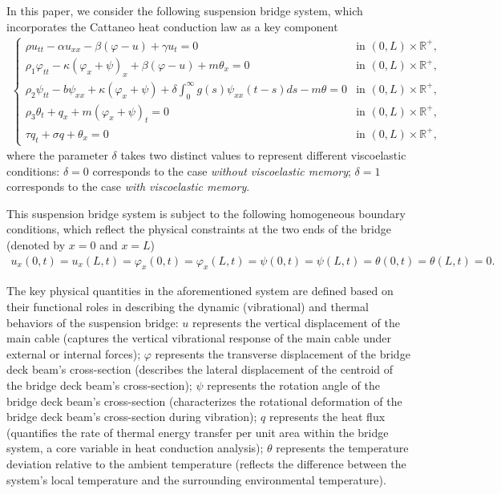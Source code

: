 \documentclass[11pt,reqno]{article}
\begin{document}
In this paper, we consider the following suspension bridge system, which incorporates the Cattaneo heat conduction law as a key component
	\begin{align}\label{model1.1}
		\begin{cases}
			\rho u_{tt} - \alpha u_{xx} - \beta(\varphi - u) + \gamma u_t = 0 & \text{in } (0,L) \times \mathbb{R}^+, \\
			\rho_1 \varphi_{tt} - \kappa(\varphi_x + \psi)_x + \beta (\varphi - u) + m \theta_x = 0 & \text{in } (0,L) \times \mathbb{R}^+, \\
			\rho_2 \psi_{tt} - b \psi_{xx} + \kappa(\varphi_x + \psi) + \delta \int_0^\infty g(s) \psi_{xx}(t-s)  ds - m \theta = 0 & \text{in } (0,L) \times \mathbb{R}^+, \\
			\rho_3 \theta_t + q_x + m (\varphi_x + \psi)_t = 0 & \text{in } (0,L) \times \mathbb{R}^+, \\
			\tau q_t + \sigma q + \theta_x = 0& \text{in } (0,L) \times \mathbb{R}^+,
		\end{cases}
	\end{align}
where the parameter $\delta$ takes two distinct values to represent different viscoelastic conditions: $\delta = 0$ corresponds to the case \textit{without viscoelastic memory}; $\delta = 1$ corresponds to the case \textit{with viscoelastic memory}.

 This suspension bridge system is subject to the following homogeneous boundary conditions, which reflect the physical constraints at the two ends of the bridge (denoted by $x=0$ and $x=L$)
	\begin{align*}
		u_x(0,t) = u_x(L,t) = \varphi_x(0,t) = \varphi_x(L,t) = \psi(0,t) = \psi(L,t) = \theta(0,t) = \theta(L,t) = 0.
	\end{align*}

The key physical quantities in the aforementioned system are defined based on their functional roles in describing the dynamic (vibrational) and thermal behaviors of the suspension bridge: $u$ represents the vertical displacement of the main cable (captures the vertical vibrational response of the main cable under external or internal forces); $\varphi$ represents the transverse displacement of the bridge deck beam's cross-section (describes the lateral displacement of the centroid of the bridge deck beam's cross-section); $\psi$ represents the rotation angle of the bridge deck beam's cross-section (characterizes the rotational deformation of the bridge deck beam's cross-section during vibration); $q$ represents the heat flux (quantifies the rate of thermal energy transfer per unit area within the bridge system, a core variable in heat conduction analysis); $\theta$  represents the temperature deviation relative to the ambient temperature (reflects the difference between the system's local temperature and the surrounding environmental temperature).
\end{document}
